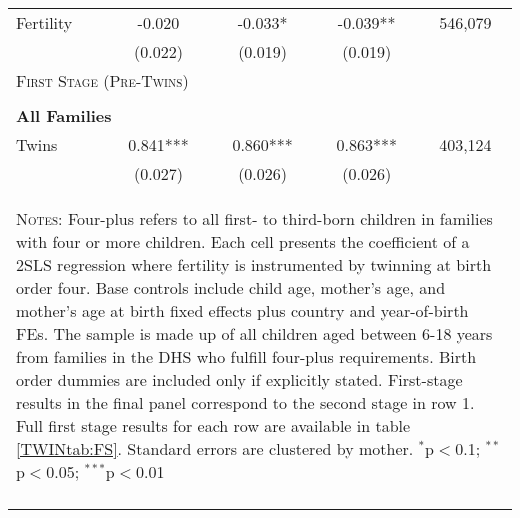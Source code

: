 \begin{table}[!htbp]
\begin{tabular}{lcccc}
Fertility&-0.020&-0.033*&-0.039**&546,079\\
         &(0.022)&(0.019)&(0.019)&\\
\midrule\multicolumn{5}{l}{\textsc{First Stage (Pre-Twins)}}\\ 
&&&&\\
\multicolumn{5}{l}{\textbf{All Families}}\\ 
Twins&0.841***&0.860***&0.863***&403,124\\
         &(0.027)&(0.026)&(0.026)&\\
\hline\multicolumn{5}{p{10cm}}{\begin{footnotesize}\textsc{Notes:} Four-plus refers to all first- to third-born children in families with four or more children.  Each cell presents the coefficient of a 2SLS regression where fertility is instrumented by twinning at birth order four.  Base controls include child age, mother's age, and mother's age at birth fixed effects plus country and year-of-birth FEs.  The sample is made up of all children aged between 6-18 years from families in the DHS who fulfill four-plus requirements. Birth order dummies are included only if explicitly stated.  First-stage results in the final panel correspond to the second stage in row 1.  Full first stage results for each row are available in table \ref{TWINtab:FS}. Standard errors are clustered by mother. 
$^{*}$p$<$0.1; $^{**}$p$<$0.05; $^{***}$p$<$0.01\end{footnotesize}}
\\\bottomrule\normalsize\end{tabular}\end{table} 
